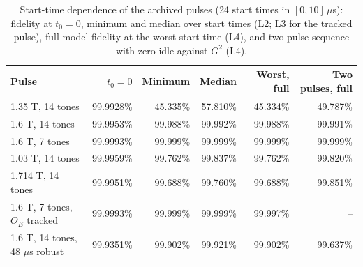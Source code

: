 \begin{table}[htbp]
\centering
\small
\setlength{\tabcolsep}{4pt}
\caption{Start-time dependence of the archived pulses (24 start times in $[0,10]\,\mu$s): fidelity at $t_0=0$, minimum and median over start times (L2; L3 for the tracked pulse), full-model fidelity at the worst start time (L4), and two-pulse sequence with zero idle against $G^2$ (L4).}\label{tab:starttime}
\begin{tabular}{lrrrrr}
\toprule
Pulse & $t_0=0$ & Minimum & Median & Worst, full & Two pulses, full \\
\midrule
1.35 T, 14 tones & 99.9928\% & 45.335\% & 57.810\% & 45.334\% & 49.787\% \\
1.6 T, 14 tones & 99.9953\% & 99.988\% & 99.992\% & 99.988\% & 99.991\% \\
1.6 T, 7 tones & 99.9993\% & 99.999\% & 99.999\% & 99.999\% & 99.999\% \\
1.03 T, 14 tones & 99.9959\% & 99.762\% & 99.837\% & 99.762\% & 99.820\% \\
1.714 T, 14 tones & 99.9951\% & 99.688\% & 99.760\% & 99.688\% & 99.851\% \\
1.6 T, 7 tones, $O_E$ tracked & 99.9993\% & 99.999\% & 99.999\% & 99.997\% & -- \\
1.6 T, 14 tones, 48 $\mu$s robust & 99.9351\% & 99.902\% & 99.921\% & 99.902\% & 99.637\% \\
\bottomrule
\end{tabular}
\end{table}
